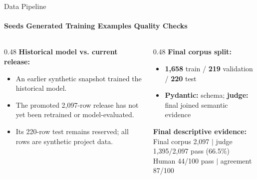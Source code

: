 \begin{frame}{Data Pipeline}
  \framesubtitle{Seeds \textrightarrow{} Generated Training Examples \textrightarrow{} Quality Checks}
  \begin{center}
    \scalebox{0.68}{}
  \end{center}
  \vspace{-0.05cm}
  \begin{columns}[T,onlytextwidth]
    \begin{column}{0.48\textwidth}
      {\footnotesize\textbf{Historical model vs. current release:}}
      {\footnotesize
      \begin{itemize}
        \setlength{\itemsep}{0.15em}
        \item An earlier synthetic snapshot trained the historical model.
        \item The promoted 2,097-row release has not yet been retrained or model-evaluated.
        \item Its 220-row test remains reserved; all rows are synthetic project data.
      \end{itemize}}
    \end{column}
    \begin{column}{0.48\textwidth}
      {\footnotesize\textbf{Final corpus split:}}
      {\footnotesize
      \begin{itemize}
        \setlength{\itemsep}{0.15em}
        \item \textbf{1,658} train / \textbf{219} validation / \textbf{220} test
        \item \textbf{Pydantic:} schema; \textbf{judge:} final joined semantic evidence
      \end{itemize}}
      \vspace{0.1em}
      {\footnotesize\textbf{Final descriptive evidence:}}\\[1pt]
      {\scriptsize
      Final corpus 2,097 $\mid$ judge 1,395/2,097 pass (66.5\%)\\
      Human 44/100 pass $\mid$ agreement 87/100}
    \end{column}
  \end{columns}
  \vspace{-0.05em}
\end{frame}
